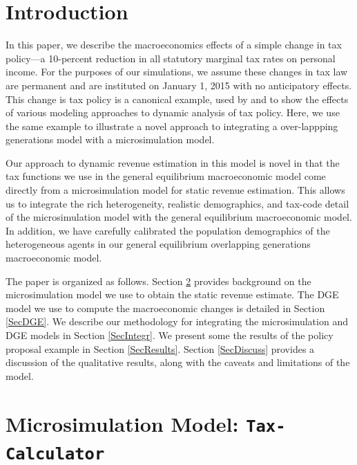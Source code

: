 \documentclass[letterpaper,12pt]{article}
\theoremstyle{definition}
\begin{document}
\begin{spacing}{1.5}

\section{Introduction}\label{SecIntro}

  In this paper, we describe the macroeconomics effects of a simple change in tax policy---a 10-percent reduction in all statutory marginal tax rates on personal income. For the purposes of our simulations, we assume these changes in tax law are permanent and are instituted on January 1, 2015 with no anticipatory effects.  This change is tax policy is a canonical example, used by \citet{CBO2004} and \citet{DM2011} to show the effects of various modeling approaches to dynamic analysis of tax policy.  Here, we use the same example to illustrate a novel approach to integrating a over-lappping generations model with a microsimulation model.

  Our approach to dynamic revenue estimation in this model is novel in that the tax functions we use in the general equilibrium macroeconomic model come directly from a microsimulation model for static revenue estimation. This allows us to integrate the rich heterogeneity, realistic demographics, and tax-code detail of the microsimulation model with the general equilibrium macroeconomic model. In addition, we have carefully calibrated the population demographics of the heterogeneous agents in our general equilibrium overlapping generations macroeconomic model.

  The paper is organized as follows. Section \ref{SecMicrosim} provides background on the microsimulation model we use to obtain the static revenue estimate. The DGE model we use to compute the macroeconomic changes is detailed in Section \ref{SecDGE}.  We describe our methodology for integrating the microsimulation and DGE models in Section \ref{SecIntegr}. We present some the results of the policy proposal example in Section \ref{SecResults}. Section \ref{SecDiscuss} provides a discussion of the qualitative results, along with the caveats and limitations of the model.


\section{Microsimulation Model: \texttt{Tax-Calculator}}\label{SecMicrosim}


\end{spacing}
\end{document}
